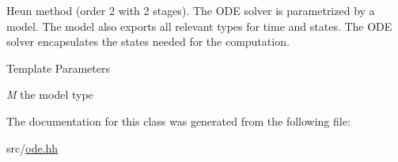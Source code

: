 Heun method (order 2 with 2 stages). The ODE solver is parametrized by a model. The model also exports all relevant types for time and states. The ODE solver encapsulates the states needed for the computation.


\begin{DoxyTemplParams}{Template Parameters}
\item[{\em M}]the model type \end{DoxyTemplParams}


The documentation for this class was generated from the following file:\begin{DoxyCompactItemize}
\item 
src/\hyperlink{ode_8hh}{ode.hh}\end{DoxyCompactItemize}
